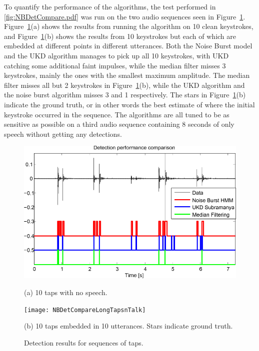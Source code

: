 To quantify the performance of the algorithms, the test performed in \ref{fig:NBDetCompare.pdf} was run on the two audio sequences seen in Figure~\ref{fig:NBDetectionResults}. Figure~\ref{fig:NBDetectionResults}(a) shows the results from running the algorithm on 10 clean keystrokes, and Figure~\ref{fig:NBDetectionResults}(b) shows the results from 10 keystrokes but each of which are embedded at different points in different utterances. Both the Noise Burst model and the UKD algorithm manages to pick up all 10 keystrokes, with UKD catching some additional faint impulses, while the median filter misses 3 keystrokes, mainly the ones with the smallest maximum amplitude. The median filter misses all but 2 keystrokes in Figure~\ref{fig:NBDetectionResults}(b), while the UKD algorithm and the noise burst algorithm misses 3 and 1 respectively. The stars in Figure~\ref{fig:NBDetectionResults}(b) indicate the ground truth, or in other words the best estimate of where the initial keystroke occurred in the sequence. The algorithms are all tuned to be as sensitive as possible on a third audio sequence containing 8 seconds of only speech without getting any detections.

\begin{figure}
\begin{minipage}[b]{1.0\linewidth}
  \centering
  \centerline{\includegraphics[width=12.5cm]{NBDetCompareLongTaps}}
  \centerline{(a) 10 taps with no speech.}\medskip
\end{minipage}
%
\begin{minipage}[b]{1.0\linewidth}
  \centering
  \centerline{\texttt{[image: NBDetCompareLongTapsnTalk]}}
  \centerline{(b) 10 taps embedded in 10 utterances. Stars indicate ground truth.}\medskip
\end{minipage}
\hfill
%
\caption{Detection results for sequences of taps.}
\label{fig:NBDetectionResults}
\end{figure}


